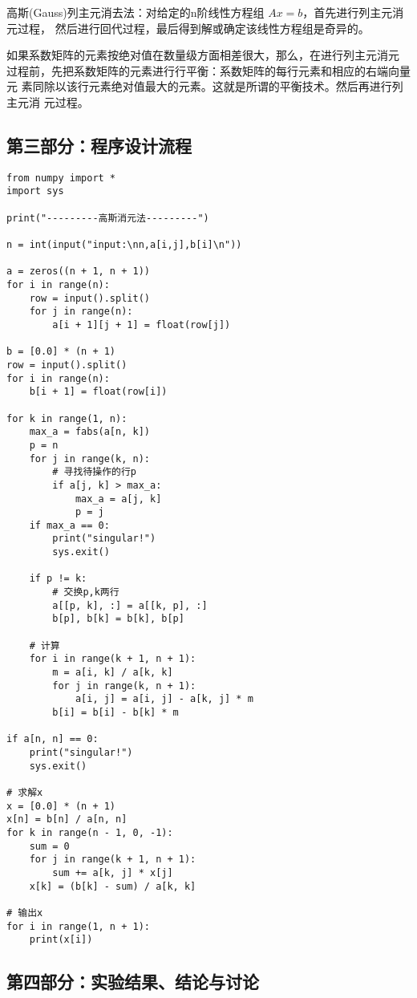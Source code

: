 \documentclass[a4paper,zihao=4,UTF8]{ctexart}
\begin{document}
高斯(Gauss)列主元消去法：对给定的n阶线性方程组 $Ax =b$，首先进行列主元消元过程，
然后进行回代过程，最后得到解或确定该线性方程组是奇异的。

如果系数矩阵的元素按绝对值在数量级方面相差很大，那么，在进行列主元消元
过程前，先把系数矩阵的元素进行行平衡：系数矩阵的每行元素和相应的右端向量元
素同除以该行元素绝对值最大的元素。这就是所谓的平衡技术。然后再进行列主元消
元过程。

\subsection*{第三部分：程序设计流程}

\begin{lstlisting}
from numpy import *
import sys

print("---------高斯消元法---------")

n = int(input("input:\nn,a[i,j],b[i]\n"))

a = zeros((n + 1, n + 1))
for i in range(n):
    row = input().split()
    for j in range(n):
        a[i + 1][j + 1] = float(row[j])

b = [0.0] * (n + 1)
row = input().split()
for i in range(n):
    b[i + 1] = float(row[i])

for k in range(1, n):
    max_a = fabs(a[n, k])
    p = n
    for j in range(k, n):
        # 寻找待操作的行p
        if a[j, k] > max_a:
            max_a = a[j, k]
            p = j
    if max_a == 0:
        print("singular!")
        sys.exit()

    if p != k:
        # 交换p,k两行
        a[[p, k], :] = a[[k, p], :]
        b[p], b[k] = b[k], b[p]

    # 计算
    for i in range(k + 1, n + 1):
        m = a[i, k] / a[k, k]
        for j in range(k, n + 1):
            a[i, j] = a[i, j] - a[k, j] * m
        b[i] = b[i] - b[k] * m

if a[n, n] == 0:
    print("singular!")
    sys.exit()

# 求解x
x = [0.0] * (n + 1)
x[n] = b[n] / a[n, n]
for k in range(n - 1, 0, -1):
    sum = 0
    for j in range(k + 1, n + 1):
        sum += a[k, j] * x[j]
    x[k] = (b[k] - sum) / a[k, k]

# 输出x
for i in range(1, n + 1):
    print(x[i])
\end{lstlisting}

\newpage

\subsection*{第四部分：实验结果、结论与讨论}
\end{document}
